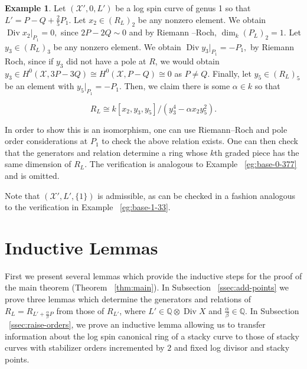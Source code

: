 \documentclass{amsart}
\theoremstyle{plain}
\theoremstyle{definition}
\newtheorem{example}[thm]{Example}
\theoremstyle{remark}
\numberwithin{equation}{section}
\newcommand\BQ{{\mathbb Q}}
\DeclareMathOperator\di{Div}
\newcommand\sx{\mathscr X}
\newcommand{\halfcan}{L}
\begin{document}
\begin{example}
\label{eg:exception-1-5}
Let $(\sx', 0, L')$ be a log spin curve of genus 1 so that $L' = P -
 Q + \frac{2}{5} P_1.$ Let $x_2 \in (R_L)_2$ be any nonzero element.
We obtain $\di x_2|_{P_1} = 0,$ since $2P - 2Q \sim 0$ and by Riemann
--Roch, $\dim_k (P_L)_2 = 1.$ Let $y_3 \in (R_\halfcan)_3$ be any nonzero
element. We obtain $\di y_3|_{P_1} = - P_1,$ by Riemann Roch, since
if $y_3$ did not have a pole at $R$, we would obtain $y_3 \in H^0
(\sx,3P-3Q) \cong H^0(\sx, P - Q) \cong 0$ as $P \neq Q$. Finally,
let $y_5 \in (R_\halfcan)_5$ be an element with $y_5|_{P_1} = -P_1$. Then,
we claim there is some $\alpha \in k$ so that

$$R_\halfcan \cong k[x_2 , y_3, y_5]/(y_3^4 - \alpha x_2 y_5^2).$$

In order to show this is an isomorphism, one can use Riemann--Roch and pole order considerations at $P_1$ to check the above relation exists. One can then check that the generators and relation determine a ring whose $k$th graded piece has the same dimension of $R_\halfcan$. The verification is analogous to Example ~\ref{eg:base-0-377} and is omitted.

Note that $(\sx', \halfcan', \{1\})$ is admissible, as can be checked in a fashion analogous to the verification in Example ~\ref{eg:base-1-33}.
\end{example}




\section{Inductive Lemmas}
\label{sec:induction}
First we present several lemmas which provide the inductive steps
for the proof of the main theorem (Theorem ~\ref{thm:main}). In
Subsection ~\ref{ssec:add-points} we prove three lemmas which
determine the generators and relations of $R_\halfcan = R_{\halfcan'
+ \frac{\alpha }{\beta}P}$ from those of $R_{\halfcan'}$, where
$\halfcan' \in \BQ \otimes \di X$ and $\frac{\alpha}{\beta} \in \BQ$. 
In Subsection ~\ref{ssec:raise-orders}, we prove an inductive lemma
allowing us to transfer information about the log spin canonical 
ring of a stacky curve to those of stacky curves with stabilizer
orders incremented by $2$ and fixed log divisor and stacky points.

\end{document}
